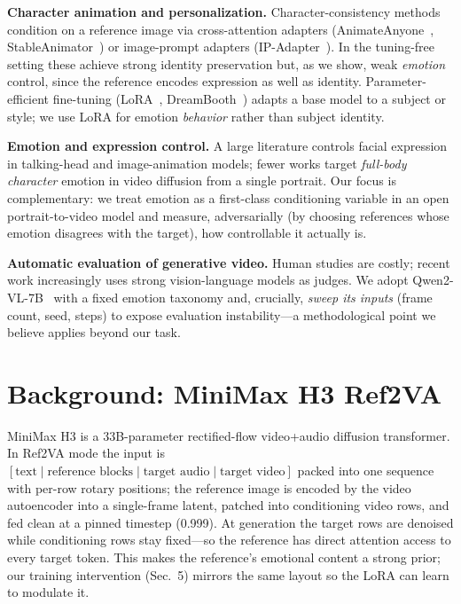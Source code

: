 \documentclass[10pt,twocolumn]{article}
\begin{document}
\textbf{Character animation and personalization.} Character-consistency methods condition on a
reference image via cross-attention adapters (AnimateAnyone~\cite{animateanyone2023},
StableAnimator~\cite{stableanimator2024}) or image-prompt adapters
(IP-Adapter~\cite{ipadapter2023}). In the tuning-free setting these achieve strong identity
preservation but, as we show, weak \emph{emotion} control, since the reference encodes expression
as well as identity. Parameter-efficient fine-tuning (LoRA~\cite{lora2021},
DreamBooth~\cite{dreambooth2022}) adapts a base model to a subject or style; we use LoRA for
emotion \emph{behavior} rather than subject identity.

\textbf{Emotion and expression control.} A large literature controls facial expression in
talking-head and image-animation models; fewer works target \emph{full-body character} emotion in
video diffusion from a single portrait. Our focus is complementary: we treat emotion as a
first-class conditioning variable in an open portrait-to-video model and measure, adversarially
(by choosing references whose emotion disagrees with the target), how controllable it actually is.

\textbf{Automatic evaluation of generative video.} Human studies are costly; recent work
increasingly uses strong vision-language models as judges. We adopt
Qwen2-VL-7B~\cite{qwen2vl2024} with a fixed emotion taxonomy and, crucially, \emph{sweep its
inputs} (frame count, seed, steps) to expose evaluation instability---a methodological point we
believe applies beyond our task.

\section{Background: MiniMax H3 Ref2VA}
MiniMax H3 is a 33B-parameter rectified-flow video+audio diffusion transformer. In Ref2VA mode the
input is $[\text{text} \mid \text{reference blocks} \mid \text{target audio} \mid
\text{target video}]$ packed into one sequence with per-row rotary positions; the reference image
is encoded by the video autoencoder into a single-frame latent, patched into conditioning video
rows, and fed clean at a pinned timestep (0.999). At generation the target rows are denoised while
conditioning rows stay fixed---so the reference has direct attention access to every target token.
This makes the reference's emotional content a strong prior; our training intervention (Sec.~5)
mirrors the same layout so the LoRA can learn to modulate it.
\end{document}
